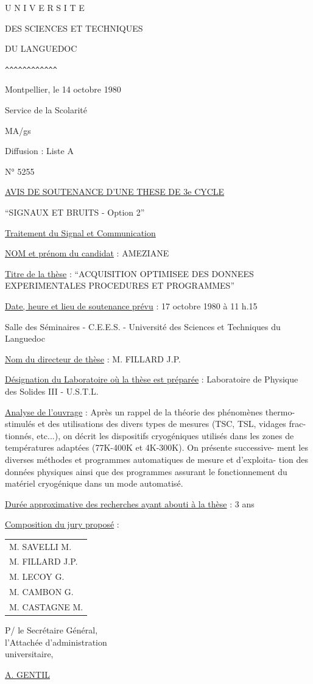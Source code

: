 
U N I V E R S I T E

DES SCIENCES ET TECHNIQUES

DU LANGUEDOC

\verb|^^^^^^^^^^^^|

\hfill Montpellier, le 14 octobre 1980

Service de la Scolarité

MA/gs

Diffusion : Liste A

N° 5255

\begin{center}
\uline{AVIS DE SOUTENANCE D'UNE THESE DE 3e CYCLE}

``SIGNAUX ET BRUITS - Option 2''

\uline{Traitement du Signal et Communication}
\end{center}

\uline{NOM et prénom du candidat} : AMEZIANE 

\uline{Titre de la thèse} : ``ACQUISITION OPTIMISEE DES DONNEES EXPERIMENTALES PROCEDURES ET PROGRAMMES''

\uline{Date, heure et lieu de soutenance prévu} : 17 octobre 1980 à 11 h.15

Salle des Séminaires - C.E.E.S. - Université des Sciences et Techniques du Languedoc

\uline{Nom du directeur de thèse} : M. FILLARD J.P.

\uline{Désignation du Laboratoire où la thèse est préparée} : Laboratoire de Physique des Solides III - U.S.T.L.

\uline{Analyse de l'ouvrage} : Après un rappel de la théorie des phénomènes thermo-\newline
stimulés et des utilisations des divers types de mesures (TSC, TSL, vidages frac-\newline
tionnés, etc...), on décrit les dispositifs cryogéniques utilisés dans les zones de températures adaptées (77K-400K et 4K-300K). On présente successive-\newline
ment les diverses méthodes et programmes automatiques de mesure et d'exploita-\newline
tion des données physiques ainsi que des programmes assurant le fonctionnement du matériel cryogénique dans un mode automatisé.

\uline{Durée approximative des recherches ayant abouti à la thèse} : 3 ans

\uline{Composition du jury proposé} :
\begin{tabular}{l}
M. SAVELLI M.\\
M. FILLARD J.P.\\
M. LECOY G.\\
M. CAMBON G.\\
M. CASTAGNE M.
\end{tabular}

\begin{flushright}
P/ le Secrétaire Général,\\
l'Attachée d'administration\\
universitaire,


\uline{A. GENTIL}
\end{flushright}
